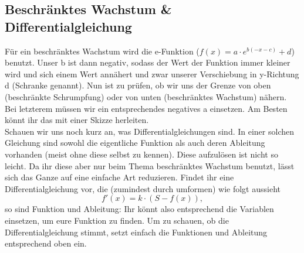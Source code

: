 \subsection{Beschränktes Wachstum \& Differentialgleichung}
	Für ein beschränktes Wachstum wird die e-Funktion (\(f(x)=a\cdot
	e^{b(-x-c)}+d\)) benutzt. Unser b ist dann negativ, sodass der Wert der
	Funktion immer kleiner wird und sich einem Wert annähert und zwar unserer
	Verschiebung in y-Richtung d (Schranke genannt). Nun ist zu prüfen, ob wir uns
	der Grenze von oben (beschränkte Schrumpfung) oder von unten (beschränktes
	Wachstum) nähern. Bei letzterem müssen wir ein entsprechendes negatives a
	einsetzen. Am Besten könnt ihr das mit einer Skizze herleiten.\\
	Schauen wir uns noch kurz an, was Differentialgleichungen sind. In einer
	solchen Gleichung sind sowohl die eigentliche Funktion als auch deren
	Ableitung vorhanden (meist ohne diese selbst zu kennen). Diese aufzulösen ist
	nicht so leicht. Da ihr diese aber nur beim Thema beschränktes Wachstum
	benutzt, lässt sich das Ganze auf eine einfache Art reduzieren. Findet ihr
	eine Differentialgleichung vor, die (zumindest durch umformen) wie folgt
	aussieht
	\[f'(x)=k\cdot (S-f(x)),\]
	so sind Funktion und Ableitung:
	\formel{\[f(x)=S+a\cdot e^{-kx},\ f'(x)=-ake^{-kx}\]}
	Ihr könnt also entsprechend die Variablen einsetzen, um eure Funktion zu
	finden. Um zu schauen, ob die Differentialgleichung stimmt, setzt einfach die
	Funktionen und Ableitung entsprechend oben ein.
